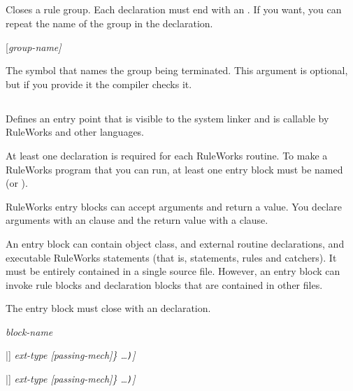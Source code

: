 \subsection{}

Closes a rule group. Each  declaration must end with an
. If you want, you can repeat the name of the group in
the  declaration.

\Format

 [\it{group-name}]

\begin{argument}
\item[group-name]

  The symbol that names the group being terminated. This argument is
  optional, but if you provide it the compiler checks it.
\end{argument}

\subsection{}

Defines an entry point that is visible to the system linker and is
callable by RuleWorks and other languages.

At least one  declaration is required for each
RuleWorks routine. To make a RuleWorks program that you can run, at
least one entry block must be named  (or ).

RuleWorks entry blocks can accept arguments and return a value.
You declare arguments with an  clause and the return value
with a  clause.

An entry block can contain object class, and external routine
declarations, and executable RuleWorks statements (that is, 
statements, rules and catchers). It must be entirely contained in a
single source file. However, an entry block can invoke rule blocks and
declaration blocks that are contained in other files.

The entry block must close with an  declaration.

\Format

 \it{block-name}

\qquad[\co{(ACCEPTS} \{\verb|<|\it{f-param-name}\verb|>|
[\verb|[|\it{size}\verb|]|] \it{ext-type} [\it{passing-mech}]\} \ldots\verb|)|]

\qquad[\co{(RETURNS} \{\verb|<|\it{f-param-name}\verb|>|
[\verb|[|\it{size}\verb|]|] \it{ext-type} [\it{passing-mech}]\} \ldots\verb|)|]


